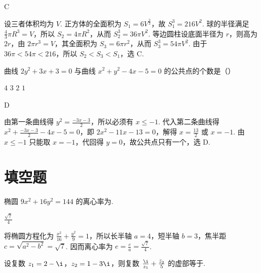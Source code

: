 \begin{answer}
C
\end{answer}

\begin{solution}
设三者体积均为 \(V\). 正方体的全面积为 \(S_1=6V^{\frac{2}{3}}\)，故 \(S_1^3=216V^2\). 球的半径满足 \(\frac{4}{3}\pi R^3=V\)，所以 \(S_2=4\pi R^2\)，从而 \(S_2^3=36\pi V^2\). 等边圆柱设底面半径为 \(r\)，则高为 \(2r\)，由 \(2\pi r^3=V\)，其全面积为 \(S_3=6\pi r^2\)，从而 \(S_3^3=54\pi V^2\). 由于 \(36\pi<54\pi<216\)，所以 \(S_2<S_3<S_1\)，选 C.
\end{solution}

\begin{problem}
曲线 \(2y^2+3x+3=0\) 与曲线 \(x^2+y^2-4x-5=0\) 的公共点的个数是（\quad）

\choices
    {\(4\)}
    {\(3\)}
    {\(2\)}
    {\(1\)}

\end{problem}

\begin{answer}
D
\end{answer}

\begin{solution}
由第一条曲线得 \(y^2=\frac{-3x-3}{2}\)，所以必须有 \(x\leqslant-1\). 代入第二条曲线得 \(x^2+\frac{-3x-3}{2}-4x-5=0\)，即 \(2x^2-11x-13=0\)，解得 \(x=\frac{13}{2}\) 或 \(x=-1\). 由 \(x\leqslant-1\) 只能取 \(x=-1\)，代回得 \(y=0\)，故公共点只有一个，选 D.
\end{solution}

\section{填空题}

\begin{problem}
椭圆 \(9x^2+16y^2=144\) 的离心率为\fillinblank{}.
\end{problem}

\begin{answer}
\(\frac{\sqrt{7}}{4}\)
\end{answer}

\begin{solution}
将椭圆方程化为 \(\frac{x^2}{16}+\frac{y^2}{9}=1\)，所以长半轴 \(a=4\)，短半轴 \(b=3\)，焦半距 \(c=\sqrt{a^2-b^2}=\sqrt{7}\). 因而离心率为 \(e=\frac{c}{a}=\frac{\sqrt{7}}{4}\).
\end{solution}

\begin{problem}
设复数 \(z_1=2-\i\)，\(z_2=1-3\i\)，则复数 \(\frac{\i}{z_1}+\frac{\bar{z}_2}{5}\) 的虚部等于\fillinblank{}.
\end{problem}

